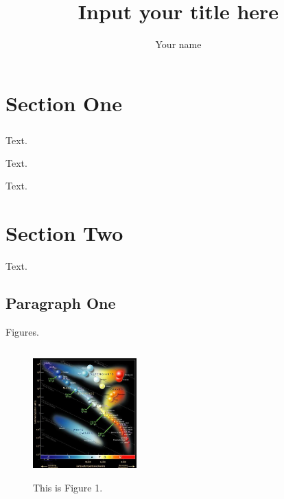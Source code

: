 \documentclass[11pt, a4paper]{article}
\title{{\Huge Input your title here}}
\author{Your name}
\numberwithin{equation}{section} %
\newcommand{\tcr}{\textcolor{blue}}
\newcommand{\upcite}[1]{\textsuperscript{\textsuperscript{\tcr{\cite{#1}}}}}
\begin{document}
\maketitle

\tableofcontents

\newpage

\section{Section One}

Text\upcite{ref1}.

Text\cite{ref1,ref2}.

Text.

\section{Section Two}

Text.

\subsection{Paragraph One}

Figures.

\begin{figure}[h]
	\centering
	\includegraphics[width=4cm,height=5cm]{2-1.png}
	\caption{This is Figure 1.}
\end{figure}
\end{document}
